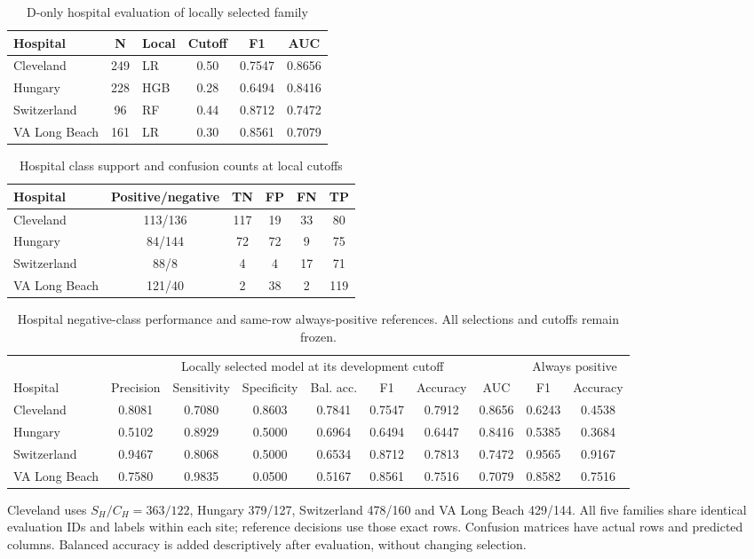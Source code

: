 \documentclass[conference]{IEEEtran}
\begin{document}
\begin{table}[ht]\centering\caption{D-only hospital evaluation of locally selected family}
\setlength{\tabcolsep}{3pt}\begin{tabular}{lclccc}\toprule Hospital & N & Local & Cutoff & F1 & AUC\\\midrule
Cleveland & 249 & LR & 0.50 & 0.7547 & 0.8656\\
Hungary & 228 & HGB & 0.28 & 0.6494 & 0.8416\\
Switzerland & 96 & RF & 0.44 & 0.8712 & 0.7472\\
VA Long Beach & 161 & LR & 0.30 & 0.8561 & 0.7079\\
\bottomrule\end{tabular}\end{table}
\begin{table}[ht]\centering\caption{Hospital class support and confusion counts at local cutoffs}
\setlength{\tabcolsep}{3pt}\begin{tabular}{lccccc}\toprule Hospital & Positive/negative & TN & FP & FN & TP\\\midrule
Cleveland & 113/136 & 117 & 19 & 33 & 80\\
Hungary & 84/144 & 72 & 72 & 9 & 75\\
Switzerland & 88/8 & 4 & 4 & 17 & 71\\
VA Long Beach & 121/40 & 2 & 38 & 2 & 119\\
\bottomrule\end{tabular}\end{table}
\begin{table}[t]\centering\caption{Hospital negative-class performance and same-row always-positive references. All selections and cutoffs remain frozen.}
\setlength{\tabcolsep}{4pt}\begin{tabular}{lccccccccc}\toprule
& \multicolumn{7}{c}{Locally selected model at its development cutoff} & \multicolumn{2}{c}{Always positive}\\
Hospital & Precision & Sensitivity & Specificity & Bal. acc. & F1 & Accuracy & AUC & F1 & Accuracy\\\midrule
Cleveland & 0.8081 & 0.7080 & 0.8603 & 0.7841 & 0.7547 & 0.7912 & 0.8656 & 0.6243 & 0.4538\\
Hungary & 0.5102 & 0.8929 & 0.5000 & 0.6964 & 0.6494 & 0.6447 & 0.8416 & 0.5385 & 0.3684\\
Switzerland & 0.9467 & 0.8068 & 0.5000 & 0.6534 & 0.8712 & 0.7813 & 0.7472 & 0.9565 & 0.9167\\
VA Long Beach & 0.7580 & 0.9835 & 0.0500 & 0.5167 & 0.8561 & 0.7516 & 0.7079 & 0.8582 & 0.7516\\
\bottomrule\end{tabular}\end{table}
Cleveland uses $S_H/C_H=363/122$, Hungary 379/127, Switzerland 478/160 and VA Long Beach 429/144. All five families share identical evaluation IDs and labels within each site; reference decisions use those exact rows. Confusion matrices have actual rows and predicted columns. Balanced accuracy is added descriptively after evaluation, without changing selection.
\end{document}
